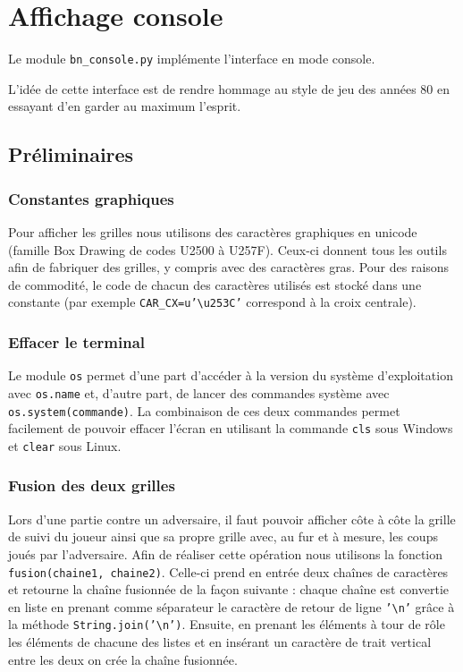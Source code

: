 \chapter{Affichage console}
Le module \texttt{bn\_console.py} implémente l'interface en mode console.

L'idée de cette interface est de rendre hommage au style de jeu des années 80 en essayant d'en garder au maximum l'esprit.

\section{Préliminaires}
\subsection{Constantes graphiques}
Pour afficher les grilles nous utilisons des caractères graphiques en unicode (famille Box Drawing de codes U2500 à U257F). Ceux-ci donnent tous les outils afin de fabriquer des grilles, y compris avec des caractères gras. Pour des raisons de commodité, le code de chacun des caractères utilisés est stocké dans une constante (par exemple \texttt{CAR\_CX=u'\textbackslash u253C'} correspond à la croix centrale).

\subsection{Effacer le terminal}
Le module \texttt{os} permet d'une part d'accéder à la version du système d'exploitation avec \texttt{os.name} et, d'autre part, de lancer des commandes système avec \texttt{os.system(commande)}. La combinaison de ces deux commandes permet facilement de pouvoir effacer l'écran en utilisant la commande \texttt{cls} sous Windows et \texttt{clear} sous Linux.

\subsection{Fusion des deux grilles}
Lors d'une partie contre un adversaire, il faut pouvoir afficher côte à côte la grille de suivi du joueur ainsi que sa propre grille avec, au fur et à mesure, les coups joués par l'adversaire. Afin de réaliser cette opération nous utilisons la fonction \texttt{fusion(chaine1, chaine2)}. Celle-ci prend en entrée deux chaînes de caractères et retourne la chaîne fusionnée de la façon suivante : chaque chaîne est convertie en liste en prenant comme séparateur le caractère de retour de ligne \texttt{'\textbackslash n'} grâce à la méthode \texttt{String.join('\textbackslash n')}. Ensuite, en prenant les éléments à tour de rôle les éléments de chacune des listes et en insérant un caractère de trait vertical entre les deux on crée la chaîne fusionnée. 


